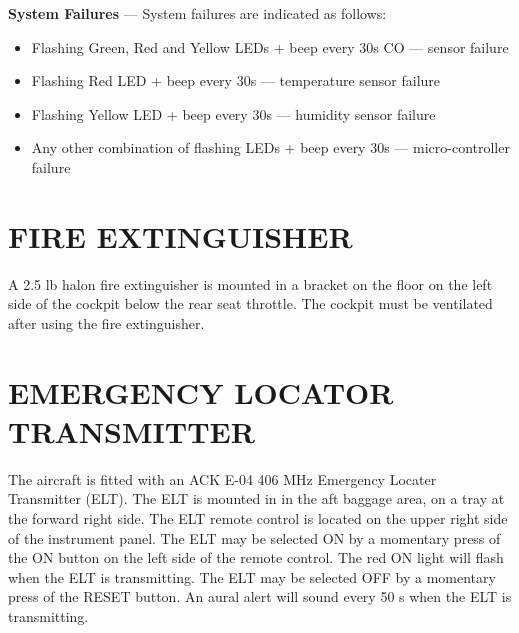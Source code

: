 \textbf{System Failures} --- System failures are indicated as follows:
\begin{itemize}
\item Flashing Green, Red and Yellow LEDs + beep every 30s CO --- sensor failure 
\item Flashing Red LED + beep every 30s --- temperature sensor failure 
\item Flashing Yellow LED + beep every 30s --- humidity sensor failure 
\item Any other combination of flashing LEDs + beep every 30s --- micro-controller failure 
\end{itemize}

\section{FIRE EXTINGUISHER}

A 2.5 lb halon fire extinguisher is mounted in a bracket on the floor on the left side  of the cockpit below the rear seat throttle. The cockpit must be ventilated after using the fire extinguisher.

\section{EMERGENCY LOCATOR TRANSMITTER} 

The aircraft is fitted with an ACK E-04 406 MHz Emergency Locater Transmitter (ELT). The ELT is mounted in in the aft baggage area, on a tray at the forward right side. The ELT remote control is located on the upper right side of the instrument panel. The ELT may be selected ON by a momentary press of the ON button on the left side of the remote control. The red ON light will flash when the ELT is transmitting. The ELT may be selected OFF by a momentary press of the RESET button. An aural alert will sound every 50 s when the ELT is transmitting.

